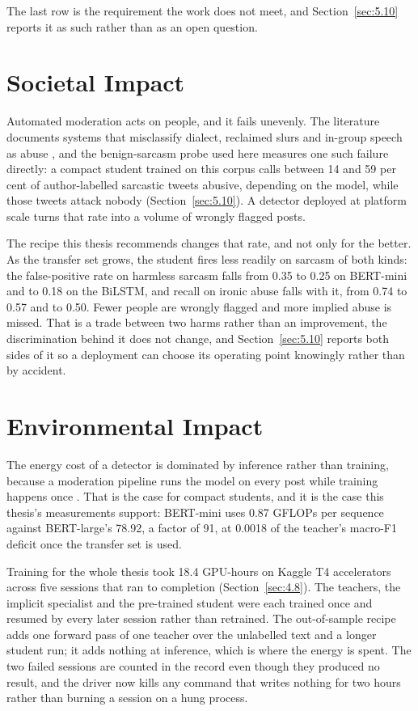 The last row is the requirement the work does not meet, and Section~\ref{sec:5.10} reports it as such
rather than as an open question.

\section{Societal Impact}
\label{sec:impact.social}
Automated moderation acts on people, and it fails unevenly. The literature documents systems that
misclassify dialect, reclaimed slurs and in-group speech as abuse
\cite{davidson2017automated, borkan2019nuanced, vidgen2020directions}, and the benign-sarcasm probe
used here measures one such failure directly: a compact student trained on this corpus calls between
14 and 59 per cent of author-labelled sarcastic tweets abusive, depending on the model, while those
tweets attack nobody (Section~\ref{sec:5.10}). A detector deployed at platform scale turns that rate
into a volume of wrongly flagged posts.

The recipe this thesis recommends changes that rate, and not only for the better. As the transfer set
grows, the student fires less readily on sarcasm of both kinds: the false-positive rate on harmless
sarcasm falls from 0.35 to 0.25 on BERT-mini and to 0.18 on the BiLSTM, and recall on ironic abuse
falls with it, from 0.74 to 0.57 and to 0.50. Fewer people are wrongly flagged and more implied abuse
is missed. That is a trade between two harms rather than an improvement, the discrimination behind it
does not change, and Section~\ref{sec:5.10} reports both sides of it so a deployment can choose its
operating point knowingly rather than by accident.

\section{Environmental Impact}
\label{sec:impact.env}
The energy cost of a detector is dominated by inference rather than training, because a moderation
pipeline runs the model on every post while training happens once
\cite{schwartz2020green, patterson2021carbon}. That is the case for compact students, and it is the
case this thesis's measurements support: BERT-mini uses 0.87 GFLOPs per sequence against BERT-large's
78.92, a factor of 91, at 0.0018 of the teacher's macro-F1 deficit once the transfer set is used.

Training for the whole thesis took 18.4 GPU-hours on Kaggle T4 accelerators across five sessions that
ran to completion (Section~\ref{sec:4.8}). The teachers, the implicit specialist and the pre-trained
student were each trained once and resumed by every later session rather than retrained. The
out-of-sample recipe adds one forward pass of one teacher over the unlabelled text and a longer
student run; it adds nothing at inference, which is where the energy is spent. The two failed sessions
are counted in the record even though they produced no result, and the driver now kills any command
that writes nothing for two hours rather than burning a session on a hung process.


